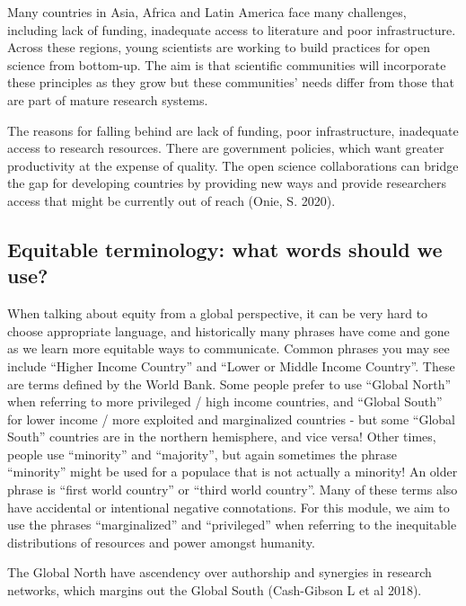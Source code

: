 \documentclass[
  letterpaper,
  DIV=11,
  numbers=noendperiod]{scrreport}
\begin{document}
Many countries in Asia, Africa and Latin America face many challenges,
including lack of funding, inadequate access to literature and poor
infrastructure. Across these regions, young scientists are working to
build practices for open science from bottom-up. The aim is that
scientific communities will incorporate these principles as they grow
but these communities' needs differ from those that are part of mature
research systems.

The reasons for falling behind are lack of funding, poor infrastructure,
inadequate access to research resources. There are government policies,
which want greater productivity at the expense of quality. The open
science collaborations can bridge the gap for developing countries by
providing new ways and provide researchers access that might be
currently out of reach (Onie, S. 2020).

\hypertarget{equitable-terminology-what-words-should-we-use}{%
\subsection{Equitable terminology: what words should we
use?}\label{equitable-terminology-what-words-should-we-use}}

When talking about equity from a global perspective, it can be very hard
to choose appropriate language, and historically many phrases have come
and gone as we learn more equitable ways to communicate. Common phrases
you may see include ``Higher Income Country'' and ``Lower or Middle
Income Country''. These are terms defined by the World Bank. Some people
prefer to use ``Global North'' when referring to more privileged / high
income countries, and ``Global South'' for lower income / more exploited
and marginalized countries - but some ``Global South'' countries are in
the northern hemisphere, and vice versa! Other times, people use
``minority'' and ``majority'', but again sometimes the phrase
``minority'' might be used for a populace that is not actually a
minority! An older phrase is ``first world country'' or ``third world
country''. Many of these terms also have accidental or intentional
negative connotations. For this module, we aim to use the phrases
``marginalized'' and ``privileged'' when referring to the inequitable
distributions of resources and power amongst humanity.

The Global North have ascendency over authorship and synergies in
research networks, which margins out the Global South (Cash-Gibson L et
al 2018).
\end{document}
